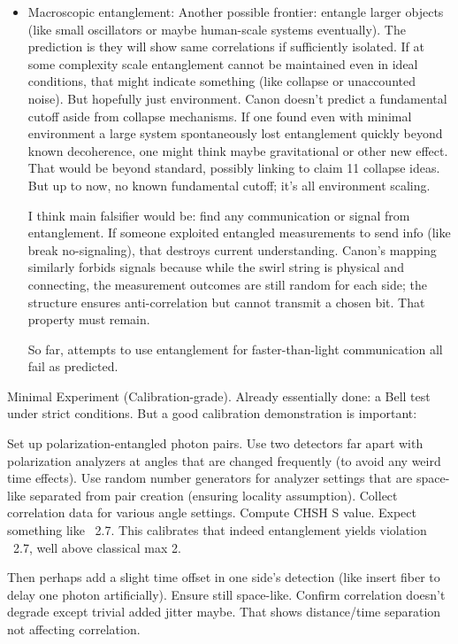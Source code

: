 \documentclass[11pt]{article}
\begin{document}
\begin{itemize}
\item 
Macroscopic entanglement: Another possible frontier: entangle larger objects (like small oscillators or maybe human-scale systems eventually). The prediction is they will show same correlations if sufficiently isolated. If at some complexity scale entanglement cannot be maintained even in ideal conditions, that might indicate something (like collapse or unaccounted noise). But hopefully just environment. Canon doesn't predict a fundamental cutoff aside from collapse mechanisms. If one found even with minimal environment a large system spontaneously lost entanglement quickly beyond known decoherence, one might think maybe gravitational or other new effect. That would be beyond standard, possibly linking to claim 11 collapse ideas. But up to now, no known fundamental cutoff; it's all environment scaling.

I think main falsifier would be: find any communication or signal from entanglement. If someone exploited entangled measurements to send info (like break no-signaling), that destroys current understanding. Canon's mapping similarly forbids signals because while the swirl string is physical and connecting, the measurement outcomes are still random for each side; the structure ensures anti-correlation but cannot transmit a chosen bit. That property must remain.

So far, attempts to use entanglement for faster-than-light communication all fail as predicted.




\end{itemize}

Minimal Experiment (Calibration-grade). Already essentially done: a Bell test under strict conditions. But a good calibration demonstration is important:

Set up polarization-entangled photon pairs. Use two detectors far apart with polarization analyzers at angles that are changed frequently (to avoid any weird time effects). Use random number generators for analyzer settings that are space-like separated from pair creation (ensuring locality assumption). Collect correlation data for various angle settings. Compute CHSH S value. Expect something like ~2.7. This calibrates that indeed entanglement yields violation ~2.7, well above classical max 2.

Then perhaps add a slight time offset in one side’s detection (like insert fiber to delay one photon artificially). Ensure still space-like. Confirm correlation doesn't degrade except trivial added jitter maybe. That shows distance/time separation not affecting correlation.
\end{document}

